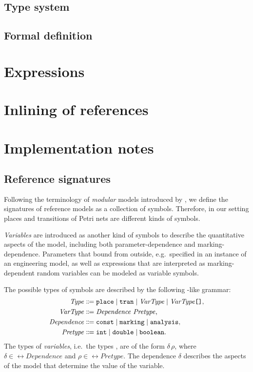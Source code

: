 \subsection{Type system}

\subsection{Formal definition}

\section{Expressions}

\section{Inlining of references}

\section{Implementation notes}

\subsection{Reference  signatures}


Following the terminology of \emph{modular } models introduced by \citet{Kindler01modular}, we define the signatures of reference  models as a collection of symbols. Therefore, in our setting places and transitions of Petri nets are different kinds of symbols.

\emph{Variables} are introduced as another kind of symbols to describe the quantitative aspects of the model, including both parameter-dependence and marking-dependence. Parameters that bound from outside, e.g.\ specified in an instance of an engineering model, as well as expressions that are interpreted as marking-dependent random variables can be modeled as variable symbols.

The possible types of symbols are described by the following -like grammar:
\begin{equation}
  \begin{aligned}
    \ebnfVar{Type} &\ebnfEq \lit{place} \mid \lit{tran} \mid \ebnfVar{VarType} \mid \bagtype{\ebnfVar{VarType}} \text, \\
    \ebnfVar{VarType} &\ebnfEq \ebnfVar{Dependence}\ \ebnfVar{Pretype} \text,\\
    \rel{Dependence} &\ebnfEq \lit{const} \mid \lit{marking} \mid \lit{analysis}\text, \\
    \ebnfVar{Pretype} &\ebnfEq \lit{int} \mid \lit{double} \mid \lit{boolean} \text.
  \end{aligned} \label{eq:rgspn:type-ebnf}
\end{equation}
The types of \emph{variables}, i.e.~the types , are of the form \(\delta\, \rho\), where \(\delta \in \rel{Dependence}\) and \(\rho \in \rel{Pretype}\). The dependence \(\delta\) describes the aspects of the model that determine the value of the variable.

